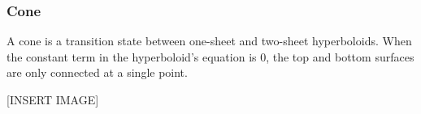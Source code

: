\subsubsection{Cone}
A cone is a transition state between one-sheet and two-sheet hyperboloids. When the constant term in the hyperboloid's equation is 0, the top and bottom surfaces are only connected at a single point.

[INSERT IMAGE]